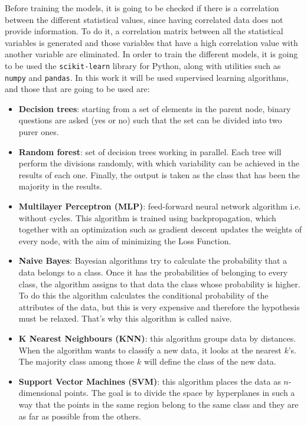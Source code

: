 Before training the models, it is going to be checked if there is a correlation between the different statistical values, since having correlated data does not provide information. To do it, a correlation matrix between all the statistical variables is generated and those variables that have a high correlation value with another variable are eliminated. In order to train the different models, it is going to be used the \texttt{scikit-learn} library for Python, along with utilities such as \texttt{numpy} and \texttt{pandas}. In this work it will be used supervised learning algorithms, and those that are going to be used are:
\begin{itemize}
    \item \textbf{Decision trees}: starting from a set of elements in the parent node, binary questions are asked (yes or no) such that the set can be divided into two purer ones.
    \item \textbf{Random forest}: set of decision trees working in parallel. Each tree will perform the divisions randomly, with which variability can be achieved in the results of each one. Finally, the output is taken as the class that has been the majority in the results. 
    \item \textbf{Multilayer Perceptron (MLP)}: feed-forward neural network algorithm i.e. without cycles. This algorithm is trained using backpropagation, which together with an optimization such as gradient descent updates the weights of every node, with the aim of minimizing the Loss Function. 
    \item \textbf{Naive Bayes}: Bayesian algorithms try to calculate the probability that a data belongs to a class. Once it has the probabilities of belonging to every class, the algorithm assigns to that data the class whose probability is higher. To do this the algorithm calculates the conditional probability of the attributes of the data, but this is very expensive and therefore the hypothesis must be relaxed. That's why this algorithm is called naive. 
    \item \textbf{K Nearest Neighbours (KNN)}: this algorithm groups data by distances. When the algorithm wants to classify a new data, it looks at the nearest $k$'s. The majority class among those $k$ will define the class of the new data.
    \item \textbf{Support Vector Machines (SVM)}: this algorithm places the data as $n$-dimensional points. The goal is to divide the space by hyperplanes in such a way that the points in the same region belong to the same class and they are as far as possible from the others.
\end{itemize}


